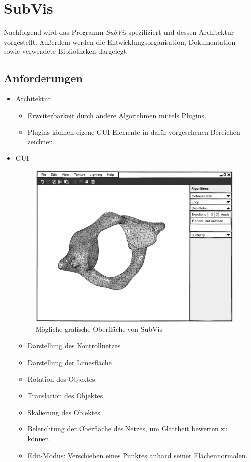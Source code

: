 \chapter{SubVis}

Nachfolgend wird das Programm \emph{SubVis} spezifiziert und dessen Architektur vorgestellt.
Außerdem werden die Entwicklungsorganisation, Dokumentation sowie verwendete Bibliotheken dargelegt.

\section{Anforderungen}

\begin{itemize}
 \item Architektur
 \begin{itemize}
 	\item Erweiterbarkeit durch andere Algorithmen mittels Plugins.
 	\item Plugins können eigene GUI-Elemente in dafür vorgesehenen Bereichen zeichnen.
 \end{itemize}
 \item GUI

 \begin{figure}[hp]
  \centering
  \includegraphics[width=\textwidth]{content/media/subvis_gui_mockup.png}
  \caption{Mögliche grafische Oberfläche von SubVis}
  \label{fig:subvis_gui_mockup}
\end{figure}

  \begin{itemize}
 	\item Darstellung des Kontrollnetzes
 	\item Darstellung der Limesfläche
 	\item Rotation des Objektes
 	\item Translation des Objektes
 	\item Skalierung des Objektes
 	\item Beleuchtung der Oberfläche des Netzes, um Glattheit bewerten zu können.
 	\item Edit-Modus: Verschieben eines Punktes anhand seiner Flächennormalen.


\end{itemize}
\end{itemize}
